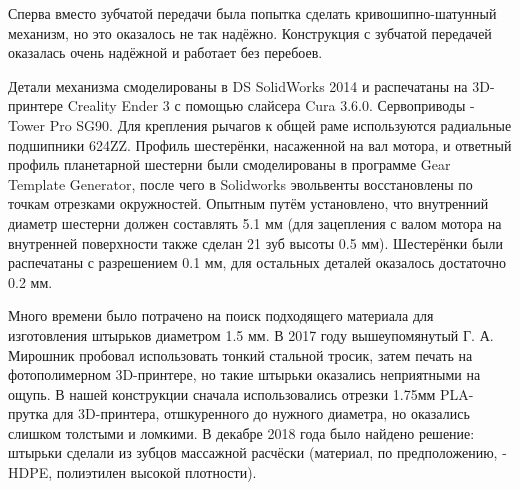 \documentclass[a4paper,12pt]{article} %
\begin{document}
Сперва вместо зубчатой передачи была попытка сделать кривошипно-шатунный механизм, но это оказалось не так надёжно. Конструкция с зубчатой передачей оказалась очень надёжной и работает без перебоев.

Детали механизма смоделированы в DS SolidWorks 2014 и распечатаны на 3D-принтере Creality Ender 3 с помощью слайсера Cura 3.6.0. Сервоприводы - Tower Pro SG90. Для крепления рычагов к общей раме используются радиальные подшипники 624ZZ. Профиль шестерёнки, насаженной на вал мотора, и ответный профиль планетарной шестерни были смоделированы в программе Gear Template Generator, после чего в Solidworks эвольвенты восстановлены по точкам отрезками окружностей. Опытным путём установлено, что внутренний диаметр шестерни должен составлять 5.1 мм (для зацепления с валом мотора на внутренней поверхности также сделан 21 зуб высоты 0.5 мм). Шестерёнки были распечатаны с разрешением 0.1 мм, для остальных деталей оказалось достаточно 0.2 мм.

Много времени было потрачено на поиск подходящего материала для изготовления штырьков диаметром 1.5 мм. В 2017 году вышеупомянутый Г. А. Мирошник пробовал использовать тонкий стальной тросик, затем печать на фотополимерном 3D-принтере, но такие штырьки оказались неприятными на ощупь. В нашей конструкции сначала использовались отрезки 1.75мм PLA-прутка для 3D-принтера, отшкуренного до нужного диаметра, но оказались слишком толстыми и ломкими. В декабре 2018 года было найдено решение: штырьки сделали из зубцов массажной расчёски (материал, по предположению, - HDPE, полиэтилен высокой плотности).
\end{document}
